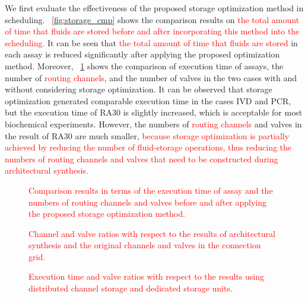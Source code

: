 We first evaluate the effectiveness of the proposed storage optimization method in scheduling. \figname~\ref{fig:storage_cmp} shows the comparison results on \textcolor{red}{the total amount of time that fluids are stored before and after incorporating this method into the scheduling.} It can be seen that \textcolor{red}{the total amount of time that fluids are stored} in each assay is reduced significantly after applying the proposed optimization method.  Moreover, \figname~\ref{fig:ideal_cmp} shows the comparison of execution time of assays, the number of \textcolor{red}{routing channels}, and the number of valves in the two cases with and without considering storage optimization.
It can be observed that storage optimization generated comparable execution time in the cases IVD and PCR, but the execution time of RA30 is slightly increased, which is acceptable for most biochemical experiments. However, the numbers of \textcolor{red}{routing channels} and valves in the result of RA30 are much smaller, \textcolor{red}{because storage optimization is partially achieved by reducing the number of fluid-storage operations, thus reducing the numbers of routing channels and valves that need to be constructed during architectural synthesis.}
\begin{figure}[t]
{\figurefontsize
\centering

\caption{\textcolor{red}{Comparison results in terms of the execution time of assay and the numbers of routing channels and valves before and after applying the proposed storage optimization method.}}
\label{fig:ideal_cmp}
}
\end{figure}

\begin{figure}[t]
{\figurefontsize
\centering
\vskip 5pt

%
\caption{
\textcolor{red}{Channel and valve ratios with respect to the results of
architectural synthesis and the original channels and valves
in the connection grid.}}
\label{fig:edge_valve_percentage}
}
\end{figure}

 \begin{figure}[t]
 {\figurefontsize
 \centering
 
% 
 \caption{\textcolor{red}{Execution time and valve ratios with respect to the results using
distributed channel storage and dedicated storage units.}}
 \label{fig:exe_time_valve_cmp}
 }
 \end{figure}




